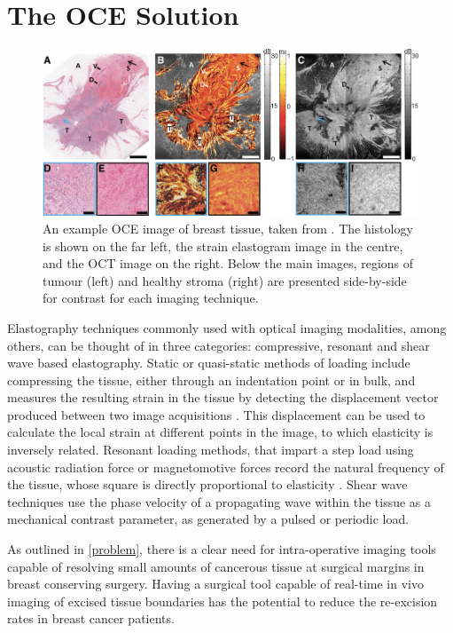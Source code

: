 \section{The OCE Solution}\label{solution}
\begin{figure}
	\centering
    \includegraphics[width=\textwidth]{bground_figs/oce_example.png}
    \caption{An example OCE image of breast tissue, taken from \cite{kennedy_investigation_2015}. The histology is shown on the far left, the strain elastogram image in the centre, and the OCT image on the right. Below the main images, regions of tumour (left) and healthy stroma (right) are presented side-by-side for contrast for each imaging technique.}
    \label{oce_example}	
\end{figure}

Elastography techniques commonly used with optical imaging modalities, among others, can be thought of in three categories: compressive, resonant and shear wave based elastography. Static or quasi-static methods of loading include compressing the tissue, either through an indentation point or in bulk, and measures the resulting strain in the tissue by detecting the displacement vector produced between two image acquisitions \cite{kennedy_optical_2014}. This displacement can be used to calculate the local strain at different points in the image, to which elasticity is inversely related. Resonant loading methods, that impart a step load using acoustic radiation force or magnetomotive forces record the natural frequency of the tissue, whose square is directly proportional to elasticity \cite{kennedy_optical_2015}. Shear wave techniques use the phase velocity of a propagating wave within the tissue as a mechanical contrast parameter, as generated by a pulsed or periodic load. 

As outlined in \autoref{problem}, there is a clear need for intra-operative imaging tools capable of resolving small amounts of cancerous tissue at surgical margins in breast conserving surgery. Having a surgical tool capable of real-time in vivo imaging of excised tissue boundaries has the potential to reduce the re-excision rates in breast cancer patients.

